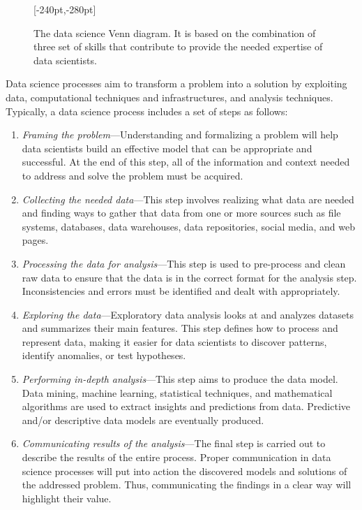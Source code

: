 \begin{figure}[!b]
[-240pt,-280pt]
\caption{\label{fig:3.2}The data science Venn diagram. It is based on the combination of three set of skills that contribute to provide the needed expertise of data scientists.}
\end{figure}

Data science processes aim to transform a problem into a solution by exploiting data, computational techniques and infrastructures, and analysis techniques. Typically, a data science process includes a set of steps as follows:

\bgroup
\def\labelenumi{(\arabic{enumi})}
\begin{enumerate}
\item \textit{Framing the problem}---Understanding and formalizing a problem will help data scientists build an effective model that can be appropriate and successful. At the end of this step, all of the information and context needed to address and solve the problem must be acquired.

\item \textit{Collecting the needed data}---This step involves realizing what data are needed and finding ways to gather that data from one or more sources such as file systems, databases, data warehouses, data repositories, social media, and web pages.

\item \textit{Processing the data for analysis}---This step is used to pre-process and clean raw data to ensure that the data is in the correct format for the analysis step. Inconsistencies and errors must be identified and dealt with appropriately.

\item \textit{Exploring the data}---Exploratory data analysis looks at and analyzes datasets and summarizes their main features. This step defines how to process and represent data, making it easier for data scientists to discover patterns, identify anomalies, or test hypotheses.

\item \textit{Performing in-depth analysis}---This step aims to produce the data model. Data mining, machine learning, statistical techniques, and mathematical algorithms are used to extract insights and predictions from data. Predictive and/or descriptive data models are eventually produced.

\item \textit{Communicating results of the analysis}---The final step is carried out to describe the results of the entire process. Proper communication in data science processes will put into action the discovered models and solutions of the addressed problem. Thus, communicating the findings in a clear way will highlight their value.
\end{enumerate}
\egroup

